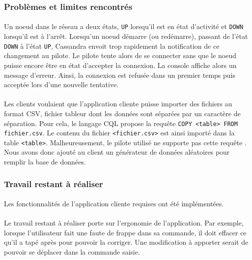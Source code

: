 \documentclass[12pt]{article}
\begin{document}
\subsubsection*{Problèmes et limites rencontrés}

\paragraph{} Un noeud dans le réseau a deux états, \texttt{UP} lorsqu'il est en état d'activité et \texttt{DOWN} lorsqu'il est à l'arrêt.
Lorsqu'un noeud démarre (ou redémarre), passant de l'état \texttt{DOWN} à l'état \texttt{UP}, Cassandra envoit trop rapidement la notification de ce changement au pilote.
Le pilote tente alors de se connecter sans que le noeud puisse encore être en état d'accepter la connexion.
La console affiche alors un message d'erreur. Ainsi, la connexion est refusée dans un premier temps puis acceptée lors d'une nouvelle tentative.

\paragraph{} Les clients voulaient que l'application cliente puisse importer des fichiers au format CSV, fichier tableur dont les données sont séparées par un caractère de séparation.
Pour cela, le langage CQL propose la requête \texttt{COPY <table> FROM fichier.csv}. Le contenu du fichier \texttt{<fichier.csv>} est ainsi importé dans la table \texttt{<table>}.
Malheureusement, le pilote utilisé ne supporte pas cette requête \cite{JavaDriverIssue330}. Nous avons donc ajouté au client un générateur de données aléatoires pour remplir la base de données.

\subsubsection*{Travail restant à réaliser}

\paragraph{} Les fonctionnalités de l'application cliente requises ont été implémentées.

\paragraph{} Le travail restant à réaliser porte sur l'ergonomie de l'application. 
Par exemple, lorsque l'utilisateur fait une faute de frappe dans sa commande, il doit effacer ce qu'il a tapé après pour pouvoir la corriger.
Une modification à apporter serait de pouvoir se déplacer dans la commande saisie.
\end{document}
